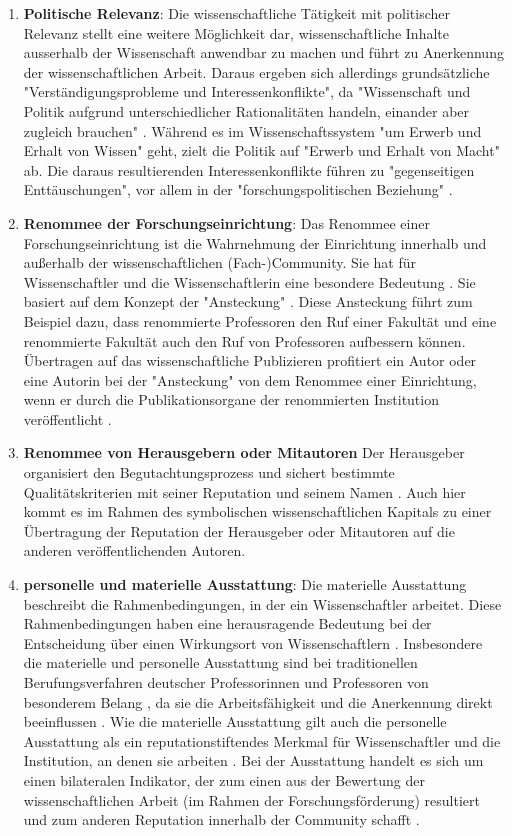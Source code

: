 \begin{enumerate}
\begin{end}
\begin{enumerate}
\item \textbf{Politische Relevanz}: Die wissenschaftliche Tätigkeit mit politischer Relevanz stellt eine weitere Möglichkeit dar, wissenschaftliche Inhalte ausserhalb der Wissenschaft anwendbar zu machen und führt zu Anerkennung der wissenschaftlichen Arbeit. Daraus ergeben sich allerdings grundsätzliche "Verständigungsprobleme und Interessenkonflikte", da  "Wissenschaft und Politik aufgrund unterschiedlicher Rationalitäten handeln, einander aber zugleich brauchen" \cite{Mayntz_1996}. Während es im Wissenschaftssystem "um Erwerb und Erhalt von Wissen" geht, zielt die Politik auf "Erwerb und Erhalt von Macht" \cite{Mayntz_1996} ab. Die daraus resultierenden Interessenkonflikte führen zu "gegenseitigen Enttäuschungen", vor allem in der "forschungspolitischen Beziehung" \cite{Mayntz_1996}.
\item \textbf{Renommee der Forschungseinrichtung}: Das Renommee einer Forschungseinrichtung ist die Wahrnehmung der Einrichtung innerhalb und außerhalb der wissenschaftlichen (Fach-)Community. Sie hat für Wissenschaftler und die Wissenschaftlerin eine besondere Bedeutung \cite{mayntz_2008_wissensproduktion}. Sie basiert auf dem Konzept der "Ansteckung" \cite{luhmann_1970_selbststeuerung}. Diese Ansteckung führt zum Beispiel dazu, dass renommierte Professoren den Ruf einer Fakultät und eine renommierte Fakultät auch den Ruf von Professoren aufbessern können. Übertragen auf das wissenschaftliche Publizieren profitiert ein Autor oder eine Autorin bei der "Ansteckung" von dem Renommee einer Einrichtung, wenn er durch die Publikationsorgane der renommierten Institution veröffentlicht \cite{lutz_2012_zugang}.
\item \textbf{Renommee von Herausgebern oder Mitautoren} Der Herausgeber organisiert den Begutachtungsprozess und sichert bestimmte Qualitätskriterien mit seiner Reputation und seinem Namen \cite{mueller_2009_peerreview}. Auch hier kommt es im Rahmen des symbolischen wissenschaftlichen Kapitals zu einer Übertragung der Reputation der Herausgeber oder Mitautoren auf die anderen veröffentlichenden Autoren.
\item \textbf{personelle und materielle Ausstattung}: Die materielle Ausstattung beschreibt die Rahmenbedingungen, in der ein Wissenschaftler arbeitet. Diese Rahmenbedingungen haben eine herausragende Bedeutung bei der Entscheidung über einen Wirkungsort von Wissenschaftlern \cite{mayntz_2008_wissensproduktion}. Insbesondere die materielle und personelle Ausstattung sind bei traditionellen Berufungsverfahren deutscher Professorinnen und Professoren von besonderem Belang \cite{himpele_2011_job}, da sie die Arbeitsfähigkeit und die Anerkennung direkt beeinflussen \cite{suche}. Wie die materielle Ausstattung gilt auch die personelle Ausstattung als ein reputationstiftendes Merkmal für Wissenschaftler und die Institution, an denen sie arbeiten \cite{mayntz_2008_wissensproduktion}. Bei der Ausstattung handelt es sich um einen bilateralen Indikator, der zum einen aus der Bewertung der wissenschaftlichen Arbeit (im Rahmen der Forschungsförderung) resultiert \cite{Herb_vermessung_2008} und  zum anderen Reputation innerhalb der Community schafft \cite{mayntz_2008_wissensproduktion}.

\end{enumerate}
\end{end}
\end{enumerate}
